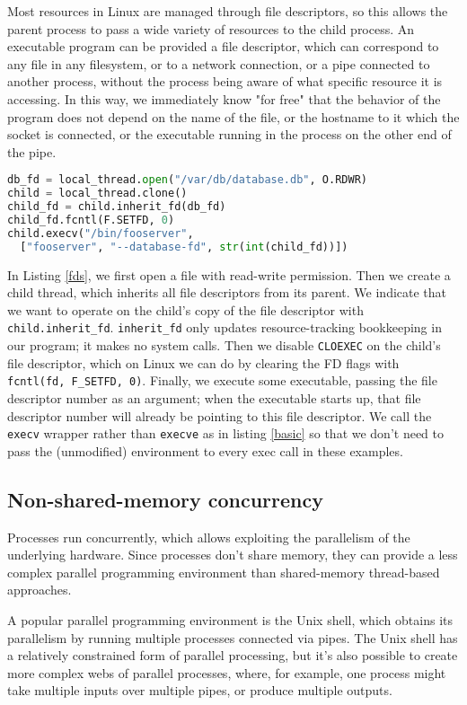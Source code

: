 \documentclass[sigplan]{acmart}
\begin{document}
Most resources in Linux are managed through file descriptors,
so this allows the parent process to pass a wide variety of resources to the child process.
An executable program can be provided a file descriptor,
which can correspond to any file in any filesystem,
or to a network connection\cite{ucspi},
or a pipe connected to another process,
without the process being aware of what specific resource it is accessing.
In this way, we immediately know "for free"\cite{theoremsforfree}
that the behavior of the program does not depend on the name of the file,
or the hostname to it which the socket is connected,
or the executable running in the process on the other end of the pipe.

\begin{lstlisting}[float=*,language=Python,label={fds},caption={Passing down FDs}]
db_fd = local_thread.open("/var/db/database.db", O.RDWR)
child = local_thread.clone()
child_fd = child.inherit_fd(db_fd)
child_fd.fcntl(F.SETFD, 0)
child.execv("/bin/fooserver",
  ["fooserver", "--database-fd", str(int(child_fd))])
\end{lstlisting}
In Listing \ref{fds},
we first open a file with read-write permission.
Then we create a child thread,
which inherits all file descriptors from its parent.
We indicate that we want to operate on the child's copy of the file descriptor with \verb|child.inherit_fd|.
\verb|inherit_fd| only updates resource-tracking bookkeeping in our program;
it makes no system calls.
Then we disable \texttt{CLOEXEC} on the child's file descriptor,
which on Linux we can do by clearing the FD flags with \verb|fcntl(fd, F_SETFD, 0)|.
Finally, we execute some executable,
passing the file descriptor number as an argument;
when the executable starts up, that file descriptor number will already be pointing to this file descriptor.
We call the \texttt{execv} wrapper rather than \texttt{execve} as in listing \ref{basic}
so that we don't need to pass the (unmodified) environment to every exec call in these examples.
\subsection{Non-shared-memory concurrency}
Processes run concurrently,
which allows exploiting the parallelism of the underlying hardware.
Since processes don't share memory,
they can provide a less complex parallel programming environment
than shared-memory thread-based approaches.

A popular parallel programming environment is the Unix shell,
which obtains its parallelism by running multiple processes connected via pipes.
The Unix shell has a relatively constrained form of parallel processing,
but it's also possible to create more complex webs of parallel processes,
where, for example, one process might take multiple inputs over multiple pipes,
or produce multiple outputs.
\end{document}
